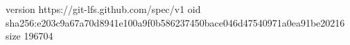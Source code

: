 version https://git-lfs.github.com/spec/v1
oid sha256:e203c9a67a70d8941e100a9f0b586237450bace046d47540971a0ea91be20216
size 196704
